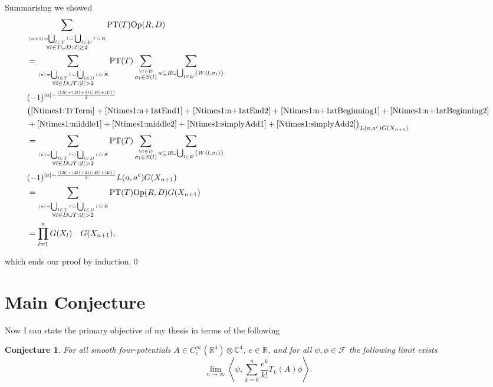 \documentclass[b5paper,draft,openbib,12pt]{memoir}
\newtheorem{Conj}[Def]{Conjecture}
\DeclareMathOperator{\dotCup}{\mathop{\dot{\bigcup}}}
\DeclareMathOperator{\dotcup}{\mathop{\dot{\cup}}}
\begin{document}
Summarising we showed 
\begin{align*}
&\sum_{\stackrel{\langle n +1 \rangle = \dotCup_{l\in T} l \dotcup \dotCup_{l\in D} l \dotcup R}{ \forall l \in T \cup D: |l|\ge 2}} \text{PT}(T) \text{Op}(R,D)\\
 &=\sum_{\stackrel{\langle n \rangle = \dotCup_{l\in T}l \dotcup \dotCup_{l\in D} l \dotcup R}{\forall l \in D \cup T: |l|>2} }\text{PT}(T) \sum_{\stackrel{\forall l \in D}{\sigma_l \in S(l)}}  \sum_{a\subseteq R \cup \bigcup_{l\in D}\{W(l,\sigma_l)\}} \\
  & (-1)^{|a|+\frac{(|R|+|D|+1)(|R|+|D|)}{2}}  \\
  &\big( \eqref{Ntimes1:TrTerm}+\eqref{Ntimes1:n+1atEnd1}+\eqref{Ntimes1:n+1atEnd2} 
  +\eqref{Ntimes1:n+1atBeginning1}+\eqref{Ntimes1:n+1atBeginning2}\\
 &+\eqref{Ntimes1:middle1}+\eqref{Ntimes1:middle2}
  +\eqref{Ntimes1:simplyAdd1}+\eqref{Ntimes1:simplyAdd2}\big)_{L(a,a^c) G(X_{n+1})}\\
 &=\sum_{\stackrel{\langle n \rangle = \dotCup_{l\in T}l \dotcup \dotCup_{l\in D} l \dotcup R}{\forall l \in D \cup T: |l|>2} }\text{PT}(T) \sum_{\stackrel{\forall l \in D}{\sigma_l \in S(l)}}  \sum_{a\subseteq R \cup \bigcup_{l\in D}\{W(l,\sigma_l)\}} \\
  & (-1)^{|a|+\frac{(|R|+|D|+1)(|R|+|D|)}{2}} L(a,a^c)G(X_{n+1})\\
  &=\sum_{\stackrel{\langle n \rangle = \dotCup_{l\in T}l \dotcup \dotCup_{l\in D} l \dotcup R}{\forall l \in D \cup T: |l|>2} }\text{PT}(T) \text{Op}(R,D)G(X_{n+1})\\
  &=\prod_{l=1}^n G(X_{l}) \quad G(X_{n+1}),
\end{align*}

which ends our proof by induction.\qed




\section{Main Conjecture}\label{sec:main result}
Now I can state the primary objective of my thesis in terms of the following
\begin{Conj}\label{main_result}
For all smooth four-potentials \(A\in C_{c}^\infty(\mathbb{R}^4)\otimes
\mathbb{C}^4\),
\(e \in \mathbb{R}\), and for all \(\psi, \phi \in
\mathcal{F}\) the following limit exists
\begin{equation}
\lim_{n\rightarrow \infty} \left\langle \psi, \sum_{k=0}^n  \frac{e^k}{k!} T_k (A)\phi \right\rangle.
\end{equation}
\end{Conj}
\end{document}
